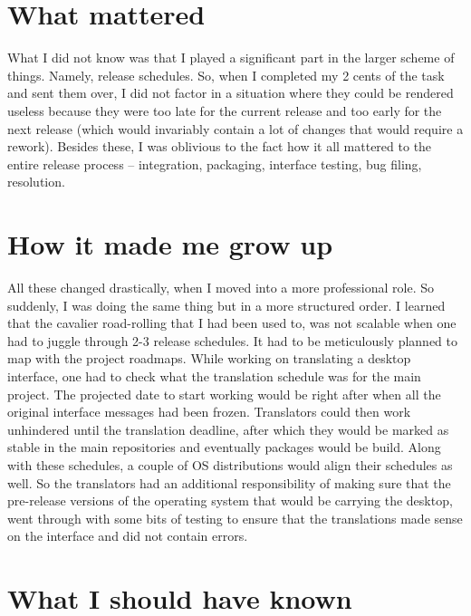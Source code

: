 \section*{What mattered}

What I did not know was that I played a significant part in the larger scheme of
things. Namely, release schedules. So, when I completed my 2 cents of the task
and sent them over, I did not factor in a situation where they could be rendered
useless because they were too late for the current release and too early for the
next release (which would invariably contain a lot of changes that would require
a rework). Besides these, I was oblivious to the fact how it all mattered to the
entire release process -- integration, packaging, interface testing, bug filing,
resolution.

\section*{How it made me grow up}

All these changed drastically, when I moved into a more professional role. So
suddenly, I was doing the same thing but in a more structured order. I learned
that the cavalier road-rolling that I had been used to, was not scalable when
one had to juggle through 2-3 release schedules. It had to be meticulously
planned to map with the project roadmaps. While working on translating a desktop
interface, one had to check what the translation schedule was for the main
project. The projected date to start working would be right after when all the
original interface messages had been frozen. Translators could then work
unhindered until the translation deadline, after which they would be marked as
stable in the main repositories and eventually packages would be build. Along
with these schedules, a couple of OS
distributions would align their schedules as well. So the translators had an
additional responsibility of making sure that the pre-release versions of the
operating system that would be carrying the desktop, went through with some bits
of testing to ensure that the translations made sense on the interface and did
not contain errors.

\section*{What I should have known}

